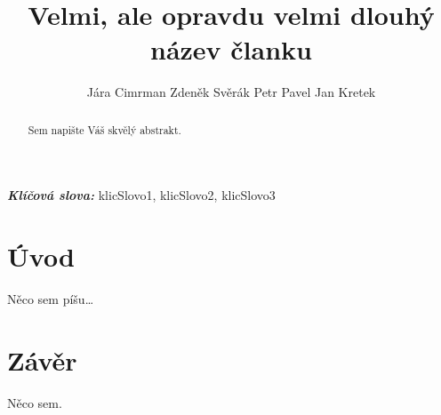 \documentclass{cygclanek}
\begin{document}
\title{Velmi, ale opravdu velmi dlouhý název članku}


\newcommand{\inst}{
	\item \label{vut} VUTBR
	\item \label{ujv} UJVas
	\item \label{ujf} UJF CAS
	\item \label{kkk} KKK
}

\author{Jára Cimrman Zdeněk Svěrák Petr Pavel Jan Kretek}

\providecommand{\keywords}[1]{\textbf{\textit{Klíčová slova:}} #1}
\newcommand{\email}{cimrman\at vut.cz}
\newcommand{\rok}{2020}

\maketitle
\begin{abstract}
	Sem napište Váš skvělý abstrakt.
\end{abstract}

\keywords{klicSlovo1, klicSlovo2, klicSlovo3}

\section{Úvod}
Něco sem píšu\dots



\section{Závěr}
Něco sem.


\printbibliography[title={Literatura}]
\end{document}
